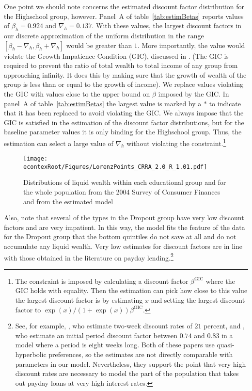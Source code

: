 \documentclass[\econtexRoot/HAFiscal]{subfiles}
\begin{document}
One point we should note concerns the estimated discount factor distribution for the Highschool group, however.
Panel~A of table~\ref{tab:estimBetas} reports values of $\beta_h=0.924$ and $\nabla_h=0.137$.
With these values, the largest discount factors in our discrete approximation of the uniform distribution in the range $[\beta_h-\nabla_h, \beta_h+\nabla_h]$ would be greater than $1$.
More importantly, the value would violate the Growth Impatience Condition (GIC), discussed in \cite{carroll2022theoretical}.
(The GIC is required to prevent the ratio of total wealth to total income of any group from approaching infinity.
It does this by making sure that the growth of wealth of the group is less than or equal to the growth of income).
We replace values violating the GIC with values close to the upper bound on $\beta$ imposed by the GIC.
In panel~A of table~\ref{tab:estimBetas} the largest value is marked by a $*$ to indicate that it has been replaced to avoid violating the GIC.
We always impose that the GIC is satisfied in the estimation of the discount factor distributions, but for the baseline parameter values it is only binding for the Highschool group.
Thus, the estimation can select a large value of $\nabla_h$ without violating the constraint.\footnote{The constraint is imposed by calculating a discount factor $\beta^{\text{GIC}}$ where the GIC holds with equality.
Then the estimation can pick how close to this value the largest discount factor is by estimating $x$ and setting the largest discount factor to $\exp(x)/(1+\exp(x)) \beta^{\text{GIC}}$.} 

\begin{figure}[th]
  \begin{center}
    \texttt{[image: \\econtexRoot/Figures/LorenzPoints\_CRRA\_2.0\_R\_1.01.pdf]}
    \caption{Distributions of liquid wealth within each educational group and for the whole population from the 2004 Survey of Consumer Finances and from the estimated model}
    \notinsubfile{\label{fig:LorenzPts}}
  \end{center}
\end{figure}

Also, note that several of the types in the Dropout group have very low discount factors and are very impatient.
In this way, the model fits the feature of the data for the Dropout group that the bottom quintiles do not save at all and do not accumulate any liquid wealth.
Very low estimates for discount factors are in line with those obtained in the literature on payday lending.\footnote{See, for example, \cite{skiba2008payday}, who estimate two-week discount rates of $21$ percent, and \cite{allcott2021high}, who estimate an initial period discount factor between $0.74$ and $0.83$ in a model where a period is eight weeks long.
Both of these papers use quasi-hyperbolic preferences, so the estimates are not directly comparable with parameters in our model.
Nevertheless, they support the point that very high discount rates are necessary to model the part of the population that takes out payday loans at very high interest rates.} 
\end{document}
